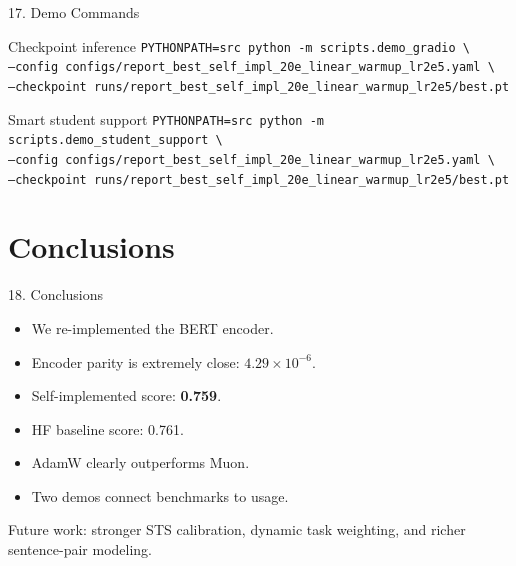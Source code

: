 \documentclass[t, aspectratio=169]{beamer}
\begin{document}
\begin{frame}{17. Demo Commands}
    \small
    \begin{block}{Checkpoint inference}
    \texttt{PYTHONPATH=src python -m scripts.demo\_gradio \textbackslash}\\
    \texttt{\quad --config configs/report\_best\_self\_impl\_20e\_linear\_warmup\_lr2e5.yaml \textbackslash}\\
    \texttt{\quad --checkpoint runs/report\_best\_self\_impl\_20e\_linear\_warmup\_lr2e5/best.pt}
    \end{block}

    \begin{block}{Smart student support}
    \texttt{PYTHONPATH=src python -m scripts.demo\_student\_support \textbackslash}\\
    \texttt{\quad --config configs/report\_best\_self\_impl\_20e\_linear\_warmup\_lr2e5.yaml \textbackslash}\\
    \texttt{\quad --checkpoint runs/report\_best\_self\_impl\_20e\_linear\_warmup\_lr2e5/best.pt}
    \end{block}
\end{frame}

\section{Conclusions}

\begin{frame}{18. Conclusions}
    \begin{itemize}
        \item We re-implemented the BERT encoder.
        \item Encoder parity is extremely close: $4.29\times10^{-6}$.
        \item Self-implemented score: \textbf{0.759}.
        \item HF baseline score: 0.761.
        \item AdamW clearly outperforms Muon.
        \item Two demos connect benchmarks to usage.
    \end{itemize}

    \vspace{0.5em}
    Future work: stronger STS calibration, dynamic task weighting, and richer sentence-pair modeling.
\end{frame}

\end{document}
